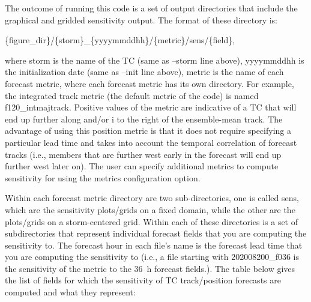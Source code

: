 \documentclass[psfig,12pt]{article}
\begin{document}
The outcome of running this code is a set of output directories that include the graphical and 
gridded sensitivity output.  The format of these directory is:

\vspace{0.1in}
\{figure\_dir\}/\{storm\}\_\{yyyymmddhh\}/\{metric\}/sens/\{field\},
\vspace{0.1in}

where storm is the name of the TC (same as --storm line above), yyyymmddhh is the initialization date
(same as --init line above), metric is the name of each forecast metric, where each forecast metric has its own
directory.  For example, the integrated track metric (the default metric of the code) is named 
f120\_intmajtrack.  Positive values of the metric are indicative of a TC that will end up further along and/or i
to the right of the ensemble-mean track.  The advantage of using this position metric is that it does not 
require specifying a particular lead time and takes into account the temporal correlation of forecast tracks 
(i.e., members that are further west early in the forecast will end up further west later on).  The user
can specify additional metrics to compute sensitivity for using the metrics configuration option.

Within each forecast metric directory are two sub-directories, one is called sens,
which are the sensitivity plots/grids on a fixed domain, while the other are the plots/grids on a storm-centered
grid.  Within each of these directories is a set of subdirectories that represent individual
forecast fields that you are computing the sensitivity to.  The forecast hour in each file's name is the
forecast lead time that you are computing the sensitivity to (i.e., a file starting with 202008200\_f036 is 
the sensitivity of the metric to the 36~h forecast fields.).  The table below gives the list of fields
for which the sensitivity of TC track/position forecasts are computed and what they represent:
\end{document}
